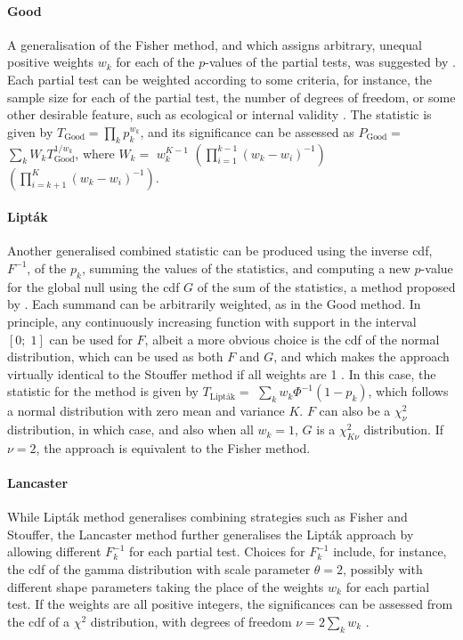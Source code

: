 \paragraph{Good}  A generalisation of the Fisher method, and which assigns arbitrary, unequal positive weights $w_{k}$ for each of the $p$-values of the partial tests, was suggested by \citet{Good1955}. Each partial test can be weighted according to some criteria, for instance, the sample size for each of the partial test, the number of degrees of freedom, or some other desirable feature, such as ecological or internal validity \citep{Rosenthal1978}. The statistic is given by $T_{\text{Good}}=\prod_{k}p_{k}^{w_{k}}$, and its significance can be assessed as $P_{\text{Good}}=$ $\sum_{k}W_{k}T_{\text{Good}}^{1/w_{k}}$, where $W_{k}=$ $w_{k}^{K-1}$ $\left(\prod_{i=1}^{k-1}\left(w_{k}-w_{i}\right)^{-1}\right)$ $\left(\prod_{i=k+1}^{K}\left(w_{k}-w_{i}\right)^{-1}\right)$.

\paragraph{Lipt\'{a}k} Another generalised combined statistic can be produced using the inverse cdf, $F^{-1}$, of the $p_{k}$, summing the values of the statistics, and computing a new $p$-value for the global null using the cdf $G$ of the sum of the statistics, a method proposed by \citet{Liptak1958}. Each summand can be arbitrarily weighted, as in the Good method. In principle, any continuously increasing function with support in the interval $[0;\; 1]$ can be used for $F$, albeit a more obvious choice is the cdf of the normal distribution, which can be used as both $F$ and $G$, and which makes the approach virtually identical to the Stouffer method if all weights are 1 \citep{vanZwet1967}. In this case, the statistic for the method is given by $T_{\text{Lipt\'{a}k}} =$ $\sum_{k} w_{k}\Phi^{-1}\left(1-p_{k}\right)$, which follows a normal distribution with zero mean and variance $K$. $F$ can also be a $\chi^{2}_{\nu}$ distribution, in which case, and also when all $w_{k}=1$, $G$ is a $\chi^{2}_{K\nu}$ distribution. If $\nu=2$, the approach is equivalent to the Fisher method.

\paragraph{Lancaster} While Lipt\'{a}k method generalises combining strategies such as Fisher and Stouffer, the Lancaster method \citep{Lancaster1961} further generalises the Lipt\'{a}k approach by allowing different $F^{-1}_{k}$ for each partial test. Choices for $F^{-1}_{k}$ include, for instance, the cdf of the gamma distribution with scale parameter $\theta=2$, possibly with different shape parameters taking the place of the weights $w_{k}$ for each partial test. If the weights are all positive integers, the significances can be assessed from the cdf of a $\chi^{2}$ distribution, with degrees of freedom $\nu=2\sum_{k}w_{k}$ \citep{Berk1979}.

